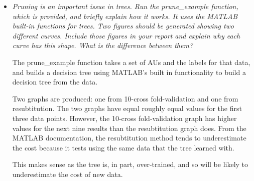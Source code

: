 \documentclass[a4paper]{article}
\begin{document}
\begin{itemize}
  \item \emph{Pruning is an important issue in trees. Run the prune\_example
      function, which is provided, and briefly explain how it works. It uses the
      MATLAB built-in functions for trees. Two figures should be generated showing
      two different curves. Include those figures in your report and explain why
    each curve has this shape. What is the difference between them?}

    The prune\_example function takes a set of AUs and the labels for that data,
    and builds a decision tree using MATLAB's built in functionality to build a
    decision tree from the data.

    Two graphs are produced: one from 10-cross fold-validation and one from
    resubtitution. The two graphs have equal roughly equal values for the first
    three data points. However, the 10-cross fold-validation graph has higher
    values for the next nine results than the resubtitution graph does.
    From the MATLAB documentation, the resubtitution method tends to underestimate
    the cost because it tests using the same data that the tree learned with.

    This makes sense as the tree is, in part, over-trained, and so will be likely to
    underestimate the cost of new data.


\end{itemize}
\end{document}
